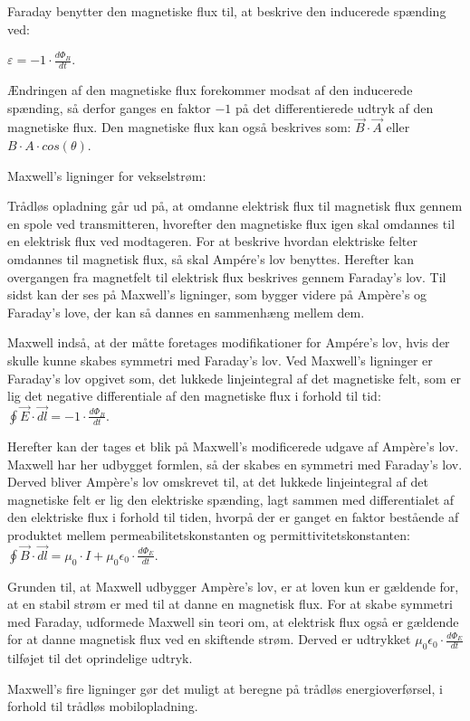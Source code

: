 Faraday benytter den magnetiske flux til, at beskrive den inducerede spænding ved:

\centerline{$\varepsilon = -1 \cdot \frac{d \Phi_B}{dt}$. \cite{fysikbog}}

Ændringen af den magnetiske flux forekommer modsat af den inducerede spænding, så derfor ganges en faktor $-1$ på det differentierede udtryk af den magnetiske flux. Den magnetiske flux kan også beskrives som: $\vec{B} \cdot \vec{A}$ eller $B \cdot A \cdot cos(\theta)$.

Maxwell's ligninger for vekselstrøm:

Trådløs opladning går ud på, at omdanne elektrisk flux til magnetisk flux gennem en spole ved transmitteren, hvorefter den magnetiske flux igen skal omdannes til en elektrisk flux ved modtageren. For at beskrive hvordan elektriske felter omdannes til magnetisk flux, så skal Ampére's lov benyttes. Herefter kan overgangen fra magnetfelt til elektrisk flux beskrives gennem Faraday's lov. Til sidst kan der ses på Maxwell's ligninger, som bygger videre på Ampère's og Faraday's love, der kan så dannes en sammenhæng mellem dem.

Maxwell indså, at der måtte foretages modifikationer for Ampére's lov, hvis der skulle kunne skabes symmetri med Faraday's lov. Ved Maxwell's ligninger er Faraday's lov opgivet som, det lukkede linjeintegral af det magnetiske felt, som er lig det negative differentiale af den magnetiske flux i forhold til tid: $\oint \vec{E} \cdot \vec{dl} = -1 \cdot \frac{d \Phi_B}{dt}$.

Herefter kan der tages et blik på Maxwell's modificerede udgave af Ampère's lov. Maxwell har her udbygget formlen, så der skabes en symmetri med Faraday's lov. Derved bliver Ampère's lov omskrevet til, at det lukkede linjeintegral af det magnetiske felt er lig den elektriske spænding, lagt sammen med differentialet af den elektriske flux i forhold til tiden, hvorpå der er ganget en faktor bestående af produktet mellem permeabilitetskonstanten og permittivitetskonstanten: $\oint \vec{B} \cdot \vec{dl} = \mu_0 \cdot I + \mu_0 \epsilon_0 \cdot \frac{d \Phi_E}{dt}$. \cite{fysikbog}

Grunden til, at Maxwell udbygger Ampère's lov, er at loven kun er gældende for, at en stabil strøm er med til at danne en magnetisk flux. For at skabe symmetri med Faraday, udformede Maxwell sin teori om, at elektrisk flux også er gældende for at danne magnetisk flux ved en skiftende strøm. Derved er udtrykket $\mu_0 \epsilon_0 \cdot \frac{d \Phi_E}{dt}$ tilføjet til det oprindelige udtryk.

Maxwell's fire ligninger gør det muligt at beregne på trådløs energioverførsel, i forhold til trådløs mobilopladning.

\newpage